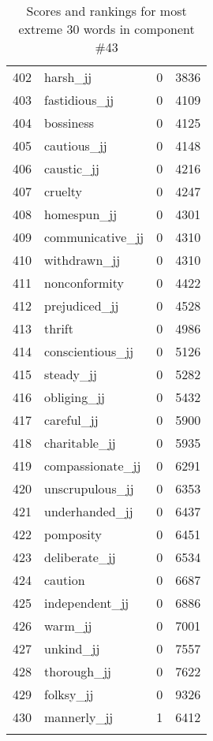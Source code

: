 \begin{longtable}[!htbp]{| rlr@{.}l |}
    402 & harsh\_jj & 0 & 3836 \\
    403 & fastidious\_jj & 0 & 4109 \\
    404 & bossiness & 0 & 4125 \\
    405 & cautious\_jj & 0 & 4148 \\
    406 & caustic\_jj & 0 & 4216 \\
    407 & cruelty & 0 & 4247 \\
    408 & homespun\_jj & 0 & 4301 \\
    409 & communicative\_jj & 0 & 4310 \\
    410 & withdrawn\_jj & 0 & 4310 \\
    411 & nonconformity & 0 & 4422 \\
    412 & prejudiced\_jj & 0 & 4528 \\
    413 & thrift & 0 & 4986 \\
    414 & conscientious\_jj & 0 & 5126 \\
    415 & steady\_jj & 0 & 5282 \\
    416 & obliging\_jj & 0 & 5432 \\
    417 & careful\_jj & 0 & 5900 \\
    418 & charitable\_jj & 0 & 5935 \\
    419 & compassionate\_jj & 0 & 6291 \\
    420 & unscrupulous\_jj & 0 & 6353 \\
    421 & underhanded\_jj & 0 & 6437 \\
    422 & pomposity & 0 & 6451 \\
    423 & deliberate\_jj & 0 & 6534 \\
    424 & caution & 0 & 6687 \\
    425 & independent\_jj & 0 & 6886 \\
    426 & warm\_jj & 0 & 7001 \\
    427 & unkind\_jj & 0 & 7557 \\
    428 & thorough\_jj & 0 & 7622 \\
    429 & folksy\_jj & 0 & 9326 \\
    430 & mannerly\_jj & 1 & 6412 \\
    \hline
    \caption{Scores and rankings for most extreme 30 words in component \#43} \\
\end{longtable}
